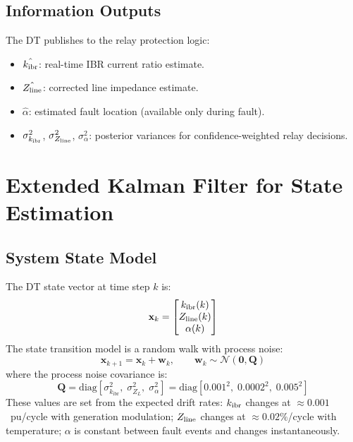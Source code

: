 \subsection{Information Outputs}

The DT publishes to the relay protection logic:
\begin{itemize}
\item $\hat{k_\mathrm{ibr}}$: real-time IBR current ratio estimate.
\item $\hat{Z_\mathrm{line}}$: corrected line impedance estimate.
\item $\hat{\alpha}$: estimated fault location (available only during fault).
\item $\sigma_{k_\mathrm{ibr}}^2$, $\sigma_{Z_\mathrm{line}}^2$, $\sigma_\alpha^2$: posterior
      variances for confidence-weighted relay decisions.
\end{itemize}

\section{Extended Kalman Filter for State Estimation}
\label{sec:ch7_ekf}

\subsection{System State Model}

The DT state vector at time step $k$ is:
\begin{equation}
  \mathbf{x}_k = \begin{bmatrix}k_\mathrm{ibr}(k) \\ Z_\mathrm{line}(k) \\ \alpha(k)\end{bmatrix}
  \label{eq:ch7_state}
\end{equation}
The state transition model is a random walk with process noise:
\begin{equation}
  \mathbf{x}_{k+1} = \mathbf{x}_k + \mathbf{w}_k, \qquad
  \mathbf{w}_k \sim \mathcal{N}(\mathbf{0}, \mathbf{Q})
  \label{eq:ch7_state_transition}
\end{equation}
where the process noise covariance is:
\begin{equation}
  \mathbf{Q} = \mathrm{diag}\!\left[\sigma_{k_\mathrm{ibr}}^2,\;
    \sigma_{Z_L}^2,\; \sigma_\alpha^2\right]
  = \mathrm{diag}[0.001^2,\; 0.0002^2,\; 0.005^2]
  \label{eq:ch7_Q}
\end{equation}
These values are set from the expected drift rates:
$k_\mathrm{ibr}$ changes at $\approx 0.001$~pu/cycle with generation modulation;
$Z_\mathrm{line}$ changes at $\approx 0.02\%$/cycle with temperature;
$\alpha$ is constant between fault events and changes instantaneously.

